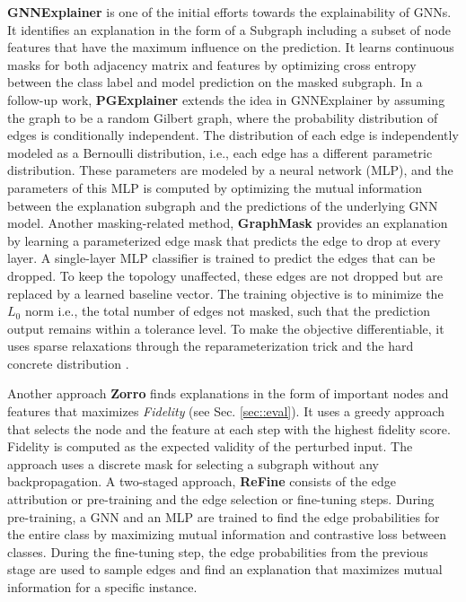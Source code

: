 
\textbf{GNNExplainer} \cite{ying2019gnnexplainer} is one of the initial efforts towards the explainability of GNNs. It identifies an explanation in the form of a Subgraph including a subset of node features that have the maximum influence on the prediction. It learns continuous masks for both adjacency matrix and features by optimizing cross entropy between the class label and model prediction on the masked subgraph. In
 a follow-up work, \textbf{PGExplainer} \cite{pgexplainer} extends the idea in GNNExplainer by assuming the graph to be a random Gilbert graph, where the probability distribution of edges is conditionally independent. The distribution of each edge is independently modeled as a Bernoulli distribution, i.e., each edge has a different parametric distribution. These parameters are modeled by a neural network (MLP), and the parameters of this MLP is computed by optimizing the mutual information between the explanation subgraph and the predictions of the underlying GNN model. Another masking-related method, \textbf{GraphMask} \cite{Graph-mask} provides an explanation by learning a parameterized edge mask that predicts the edge to drop at every layer. A single-layer MLP classifier is trained to predict the edges that can be dropped. To keep the topology unaffected, these edges are not dropped but are replaced by a learned baseline vector. The training objective is to minimize the $L_0$ norm i.e., the total number of edges not masked, such that the prediction output remains within a tolerance level. To make the objective differentiable, it uses sparse relaxations through the reparameterization trick and the hard concrete distribution \cite{concrete-distri, repara-trick}. 
 
 Another approach \textbf{Zorro} \cite{zorro} finds explanations in the form of important nodes and features that maximizes \textit{Fidelity} (see Sec. \ref{sec::eval}). It uses a greedy approach that selects the node and the feature at each step with the highest fidelity score. Fidelity is computed as the expected validity of the perturbed input. The approach uses a discrete mask for selecting a subgraph without any backpropagation.
A two-staged approach, \textbf{ReFine} \cite{ReFine} consists of the edge attribution or pre-training and the edge selection or fine-tuning steps. During pre-training, a GNN and an MLP are trained to find the edge probabilities for the entire class by maximizing mutual information and contrastive loss between classes. During the fine-tuning step, the edge probabilities from the previous stage are used to sample edges and find an explanation that maximizes mutual information for a specific instance.

